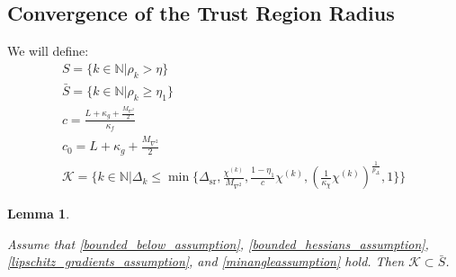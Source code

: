 \documentclass{article}
\newtheorem{lemma}[theorem]{Lemma}
\theoremstyle{case}
\numberwithin{theorem}{subsection}
\newcommand{\chik}{{\chi^{(k)}}}
\newcommand{\dk}{\Delta_k}
\newcommand{\dsr}{{\Delta_{\textrm{sr}}}}
\newcommand{\maxhessian}{{M_{\nabla^2}}}
\newcommand{\naturals}{\mathbb N}
\newcommand{\rk}{\rho_k}
\begin{document}
\subsection{Convergence of the Trust Region Radius}

We will define:
\begin{align}
S = \{k \in \naturals | \rk > \eta \} \\
\bar{S} = \{k \in \naturals | \rk \ge \eta_1 \} \\
c = \frac{L + \kappa_{g} + \frac {\maxhessian} 2}{\kappa_f} \\
c_0 = L + \kappa_{g} + \frac {\maxhessian} 2 \\
\mathcal K = \big \{ k \in \naturals | \dk \le \min \{ \dsr, \frac {\chik}{\maxhessian}, \frac{1-\eta_1}{c}\chik, \left(\frac 1 {\kappa_{\chi}}  \chik\right)^{\frac 1 {p_{\Delta}}}, 1 \} \big \} \label{define_mathcal_k}
\end{align}


\begin{lemma}
\label{mathcal_k_subset_bar_s}



Assume that 
\cref{bounded_below_assumption},
\cref{bounded_hessians_assumption},
\cref{lipschitz_gradients_assumption},
and \cref{minangleassumption} hold.
Then $\mathcal K \subset \bar{S}$.
\end{lemma}
 
\end{document}
